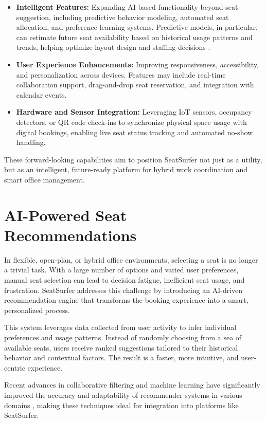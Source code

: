 \documentclass[12pt,a4paper]{report} %
\begin{document}
\begin{itemize}
\item \textbf{Intelligent Features:}
Expanding AI-based functionality beyond seat suggestion, including predictive behavior modeling, automated seat allocation, and preference learning systems. Predictive models, in particular, can estimate future seat availability based on historical usage patterns and trends, helping optimize layout design and staffing decisions \cite{nguyen2023predictive}.
\item \textbf{User Experience Enhancements:}  
Improving responsiveness, accessibility, and personalization across devices. Features may include real-time collaboration support, drag-and-drop seat reservation, and integration with calendar events.
\item \textbf{Hardware and Sensor Integration:}  
Leveraging IoT sensors, occupancy detectors, or QR code check-ins to synchronize physical space usage with digital bookings, enabling live seat status tracking and automated no-show handling.
\end{itemize}

These forward-looking capabilities aim to position SeatSurfer not just as a utility, but as an intelligent, future-ready platform for hybrid work coordination and smart office management.

\section{AI-Powered Seat Recommendations}

In flexible, open-plan, or hybrid office environments, selecting a seat is no longer a trivial task. With a large number of options and varied user preferences, manual seat selection can lead to decision fatigue, inefficient seat usage, and frustration. SeatSurfer addresses this challenge by introducing an AI-driven recommendation engine that transforms the booking experience into a smart, personalized process.

This system leverages data collected from user activity to infer individual preferences and usage patterns. Instead of randomly choosing from a sea of available seats, users receive ranked suggestions tailored to their historical behavior and contextual factors. The result is a faster, more intuitive, and user-centric experience.

Recent advances in collaborative filtering and machine learning have significantly improved the accuracy and adaptability of recommender systems in various domains \cite{ali2023survey}, making these techniques ideal for integration into platforms like SeatSurfer.
\end{document}

